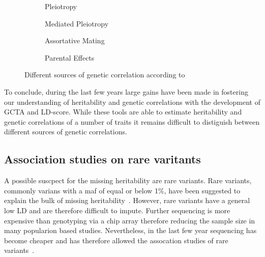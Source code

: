 \begin{figure}[htp]
  \begin{subfigure}[t]{0.5\textwidth}
    \centering
    \resizebox{0.5\linewidth}{!}{} 
    \caption{Pleiotropy}\label{fig:pleiotropy}
  \end{subfigure}
  \begin{subfigure}[t]{0.5\textwidth}
    \centering
    \resizebox{0.5\linewidth}{!}{} 
    \caption{Mediated Pleiotropy}\label{fig:mediated_pleiotropy}
  \end{subfigure}
  \begin{subfigure}[t]{0.5\textwidth}
    \centering
    \resizebox{0.6\linewidth}{!}{} 
    \caption{Assortative Mating}\label{fig:assortative_mating}
  \end{subfigure}
  \begin{subfigure}[t]{0.5\textwidth}
    \centering
    \resizebox{0.6\linewidth}{!}{}
    \caption{Parental Effects}\label{fig:parental_effects}
  \end{subfigure}
  \caption{Different sources of genetic correlation according to~\citet{Pickrell2016}}\label{fig:genetic_correlation}
\end{figure}

To conclude, during the last few years large gains have been made in fostering our understanding of heritability and genetic correlations with the development of GCTA and LD-score.
While these tools are able to estimate heritability and genetic correlations of a number of traits it remains difficult to distiguish between different sources of genetic correlations.

\subsection{Association studies on rare varitants}
\label{sub:association_studies_on_rare_varitants}

A possible suscpect for the missing heritability are rare variants.
Rare variants, commonly varians with a \acrfull{maf} of equal or below 1\%, have been suggested to explain the bulk of missing heritability~\cite{Jiang2013,Li2009a}.
However, rare variants have a general low LD and are therefore difficult to impute.
Further sequencing is more expensive than genotyping via a chip array therefore reducing the sample size in many popularion based studies.
Nevertheless, in the last few year sequencing has become cheaper and has therefore allowed the assocation studies of rare variants~\cite{Goodwin2016}.


